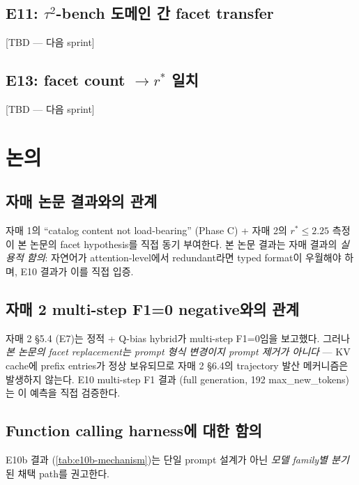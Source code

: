 \documentclass[11pt]{article}
\theoremstyle{plain}
\theoremstyle{definition}
\theoremstyle{remark}
\begin{document}
\subsection{E11: $\tau^2$-bench 도메인 간 facet transfer}
\label{sec:results-e11}

[TBD — 다음 sprint]

\subsection{E13: facet count $\to r^*$ 일치}
\label{sec:results-e13}

[TBD — 다음 sprint]

\section{논의}
\label{sec:discussion}

\subsection{자매 논문 결과와의 관계}
\label{sec:siblings-relation}

자매 1의 ``catalog content not load-bearing'' (Phase C) + 자매 2의 $r^* \le 2.25$ 측정이 본 논문의 facet hypothesis를 직접 동기 부여한다. 본 논문 결과는 자매 결과의 \emph{실용적 함의}: 자연어가 attention-level에서 redundant라면 typed format이 우월해야 하며, E10 결과가 이를 직접 입증.

\subsection{자매 2 multi-step F1=0 negative와의 관계}
\label{sec:e7-relation}

자매 2 \citep{sibling2027prompt} §5.4 (E7)는 정적 + Q-bias hybrid가 multi-step F1=0임을 보고했다. 그러나 \emph{본 논문의 facet replacement는 prompt 형식 변경이지 prompt 제거가 아니다} — KV cache에 prefix entries가 정상 보유되므로 자매 2 §6.4의 trajectory 발산 메커니즘은 발생하지 않는다. E10 multi-step F1 결과 (full generation, 192 max\_new\_tokens)는 이 예측을 직접 검증한다.

\subsection{Function calling harness에 대한 함의}
\label{sec:harness}

E10b 결과 (\cref{tab:e10b-mechanism})는 단일 prompt 설계가 아닌 \emph{모델 family별 분기}된 채택 path를 권고한다.
\end{document}

